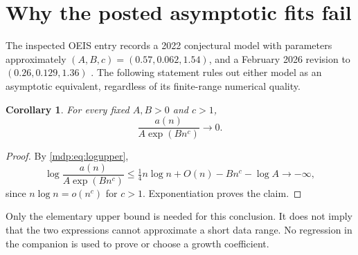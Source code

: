 \documentclass[11pt,letterpaper]{article}
\numberwithin{equation}{section}
\newtheorem{corollary}[theorem]{Corollary}
\theoremstyle{remark}\newtheorem{remark}[theorem]{Remark}
\begin{document}
\section{Why the posted asymptotic fits fail}
The inspected OEIS entry records a 2022 conjectural model with
parameters approximately $(A,B,c)=(0.57,0.062,1.54)$, and a February
2026 revision to $(0.26,0.129,1.36)$ \cite{oeis}. The following statement
rules out either model as an asymptotic equivalent, regardless of
its finite-range numerical quality.

\begin{corollary}\label{mdp:cor:fits}
For every fixed $A,B>0$ and $c>1$,
\begin{equation}\label{mdp:eq:fits}
 \frac{a(n)}{A\exp(Bn^c)}\longrightarrow0.
\end{equation}
\end{corollary}
\begin{proof}
By \eqref{mdp:eq:logupper},
\[
 \log\frac{a(n)}{A\exp(Bn^c)}
 \le\tfrac14n\log n+O(n)-Bn^c-\log A\longrightarrow-\infty,
\]
since $n\log n=o(n^c)$ for $c>1$. Exponentiation proves the claim.
\end{proof}
Only the elementary upper bound is needed for this conclusion.
It does not imply that the two expressions cannot approximate a
short data range. No regression in the companion is used to prove or
choose a growth coefficient.
\end{document}
